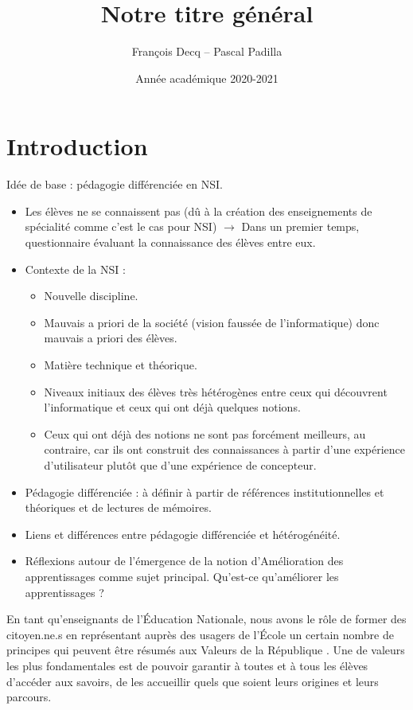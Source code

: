 \documentclass[a4paper]{article}
\title{Notre titre général}
\author{François Decq -- Pascal Padilla}
\date{Année académique 2020-2021}
\begin{document}
\maketitle\newpage

\section*{Introduction}
Idée de base : pédagogie différenciée en NSI.
\begin{itemize}
	\item Les élèves ne se connaissent pas (dû à la création des enseignements de spécialité comme c'est le cas pour NSI) $\rightarrow$ Dans un premier temps, questionnaire évaluant la connaissance des élèves entre eux.
	\item Contexte de la NSI :
	\begin{itemize}
		\item Nouvelle discipline.
		\item Mauvais a priori de la société (vision faussée de l'informatique) donc mauvais a priori des élèves.
		\item Matière technique et théorique.
		\item Niveaux initiaux des élèves très hétérogènes entre ceux qui découvrent l'informatique et ceux qui ont déjà quelques notions.
		\item Ceux qui ont déjà des notions ne sont pas forcément meilleurs, au contraire, car ils ont construit des connaissances à partir d'une expérience d'utilisateur plutôt que d'une expérience de concepteur.
	\end{itemize}
	\item Pédagogie différenciée : à définir à partir de références institutionnelles et théoriques et de lectures de mémoires.
	\item Liens et différences entre pédagogie différenciée et hétérogénéité.
	\item Réflexions autour de l'émergence de la notion d'\og Amélioration des apprentissages \fg{} comme sujet principal. Qu'est-ce qu'améliorer les apprentissages ?
\end{itemize}



En tant qu'enseignants de l'Éducation Nationale, nous avons le rôle de former des citoyen.ne.s en représentant auprès des usagers de l'École un certain nombre de principes qui peuvent être résumés aux \og Valeurs de la République \fg{}. Une de valeurs les plus fondamentales est de pouvoir garantir à toutes et à tous les élèves d'accéder aux savoirs, de les accueillir quels que soient leurs origines et leurs parcours.
\end{document}
